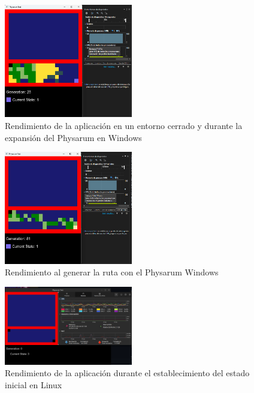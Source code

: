     \begin{figure}[htbp]
        \centering
        \includegraphics[width=0.5\textwidth]{./images/Pruebas/simulador/image049.png}
        \caption{Rendimiento de la aplicaci\'on en un entorno cerrado y durante la expansi\'on del Physarum en Windows}
        \label{fig:Ruta 49}
    \end{figure}
    \vskip 0.5cm
    \begin{figure}[htbp]
        \centering
        \includegraphics[width=0.5\textwidth]{./images/Pruebas/simulador/image051.png}
        \caption{Rendimiento al generar la ruta con el Physarum Windows}
        \label{fig:Ruta 51}
    \end{figure}
    \vskip 0.5cm
    \begin{figure}[htbp]
        \centering
        \includegraphics[width=0.5\textwidth]{./images/Pruebas/simulador/image053.png}
        \caption{Rendimiento de la aplicaci\'on durante el establecimiento del estado inicial en Linux}
        \label{fig:Ruta 53}
    \end{figure}
